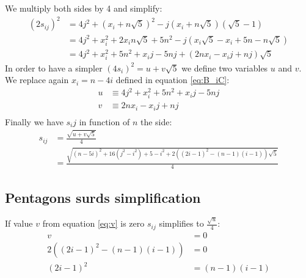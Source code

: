 \documentclass[11pt]{article}
\begin{document}
We multiply both sides by 4 and simplify:   
\begin{align}
(2s_{ij})^2 &= 4j^2 + (x_i + n\sqrt{5})^2 - j(x_i + n\sqrt{5})(\sqrt{5} - 1) \\
 &= 4j^2 + x_i^2 + 2x_in\sqrt{5} + 5n^2 - j(x_i\sqrt{5} - x_i + 5n - n\sqrt{5})\\
 &= 4j^2 + x_i^2 + 5n^2 + x_ij - 5nj + (2nx_i - x_ij + nj)\sqrt{5}
\end{align}
In order to have a simpler $(4s_i)^2 = u+v\sqrt{5}$ we define two variables $u$ and $v$.
We replace again $x_i = n - 4i$ defined in equation \ref{eq:B_iC}:
\begin{align}
u &\equiv 4j^2 + x_i^2 + 5n^2 + x_ij - 5nj \nonumber\\
v &\equiv 2nx_i - x_ij + nj \nonumber\\
\end{align}
Finally we have $s_ij$ in function of $n$ the side:
\begin{align}
s_{ij} &= \frac{\sqrt{u+v\sqrt{5}}}{4} \nonumber\\
 &= \frac{\sqrt{(n - 5i)^2 + 16(j^2-i^2) + 5 - i^2 + 2((2i-1)^2 - (n-1)(i-1))\sqrt{5}}}{4}
\end{align}

\subsection{Pentagons surds simplification}

If value $v$ from equation \ref{eq:v} is zero $s_{ij}$ simplifies to $\frac{\sqrt{u}}{4}$:
\begin{align}
v &= 0 \nonumber\\
2((2i-1)^2 - (n-1)(i-1)) &= 0 \nonumber\\
(2i-1)^2 &= (n-1)(i-1)
\end{align}
\end{document}
